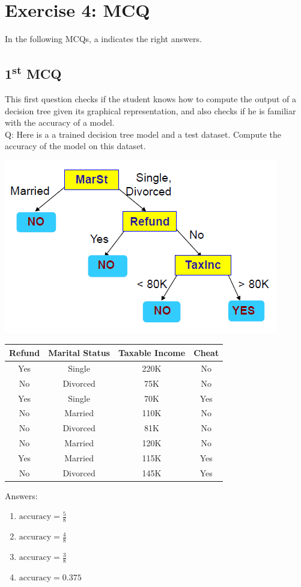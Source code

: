 \documentclass[a4paper, 10pt]{article}
\begin{document}
\section{Exercise 4: MCQ}
In the following MCQs, a \textdagger{} indicates the right answers.
\subsection{1\textsuperscript{st} MCQ}
This first question checks if the student knows how to compute the output of a decision tree
given its graphical representation, and also checks if he is familiar with the accuracy of a model.
\\
Q: Here is a a trained decision tree model and a test dataset. Compute the accuracy of the model on
this dataset.
\begin{center}
    \includegraphics[scale=0.6]{qcm1_tree}    
\end{center}
\begin{center}
    \begin{tabular}{ |c|c|c||c| }
        \hline
        Refund & Marital Status & Taxable Income & Cheat \\
        \hline
        Yes & Single & 220K & No \\
        \hline
        No & Divorced & 75K & No \\
        \hline
        Yes & Single & 70K & Yes \\
        \hline
        No & Married & 110K & No \\
        \hline
        No & Divorced & 81K & No \\
        \hline
        No & Married & 120K & No \\
        \hline
        Yes & Married & 115K & Yes \\
        \hline
        No & Divorced & 145K & Yes \\
        \hline
    \end{tabular}
\end{center}
Answers:
\begin{enumerate}
    \item $\text{accuracy} = \frac{5}{8}$ \textdagger
    \item $\text{accuracy} = \frac{4}{8}$
    \item $\text{accuracy} = \frac{3}{8}$
    \item $\text{accuracy} = 0.375$
\end{enumerate}
\end{document}
